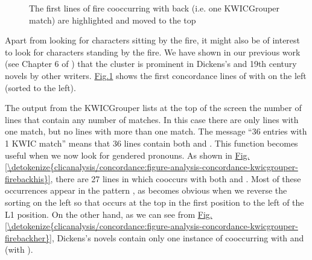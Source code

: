 \documentclass[letterpaper,10pt,english]{sphinxmanual}
\begin{document}
\begin{figure}[htbp]
\centering
\capstart

\noindent{}
\caption{The first lines of fire co\sphinxhyphen{}occurring with back (i.e. one
KWICGrouper match) are highlighted and moved to the top}\label{\detokenize{clicanalysis/concordance:id18}}\label{\detokenize{clicanalysis/concordance:figure-analysis-concordance-kwicgrouper-fireback}}\end{figure}

\sphinxAtStartPar
Apart from looking for characters sitting by the fire, it might also be
of interest to look for characters standing by the fire. We have shown
in our previous work (see Chapter 6 of ) that the cluster
 is prominent in Dickens’s and 19th century
novels by other writers.
\hyperref[\detokenize{clicanalysis/concordance:figure-analysis-concordance-kwicgrouper-fireback}]{Fig.\@ \ref{\detokenize{clicanalysis/concordance:figure-analysis-concordance-kwicgrouper-fireback}}} shows the
first concordance lines of  with  on the left (sorted to the
left).

\sphinxAtStartPar
The output from the KWICGrouper lists at the top of the screen the
number of lines that contain any number of matches. In this case
there are only lines with one match, but no lines with more than one
match. The message “36 entries with 1 KWIC match” means that 36 lines
contain both  and . This function becomes useful when we now
look for gendered pronouns. As shown in
\hyperref[\detokenize{clicanalysis/concordance:figure-analysis-concordance-kwicgrouper-firebackhis}]{Fig.\@ \ref{\detokenize{clicanalysis/concordance:figure-analysis-concordance-kwicgrouper-firebackhis}}}, there
are 27 lines in which  co\sphinxhyphen{}occurs with both  and . Most
of these occurrences appear in the pattern ,
as becomes obvious when we reverse the sorting on the left so that
 occurs at the top in the first position to the left of  \textendash{} the L1
position. On the other hand, as we can see from
\hyperref[\detokenize{clicanalysis/concordance:figure-analysis-concordance-kwicgrouper-firebackher}]{Fig.\@ \ref{\detokenize{clicanalysis/concordance:figure-analysis-concordance-kwicgrouper-firebackher}}},
Dickens’s novels contain only one instance of  co\sphinxhyphen{}occurring with
 and  (with ).
\end{document}
